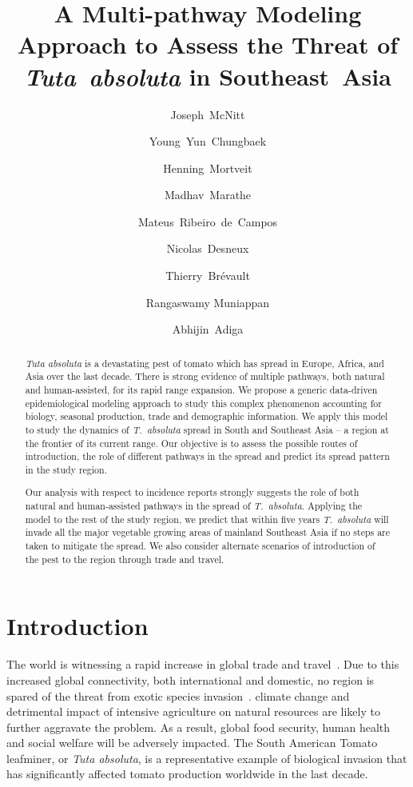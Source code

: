 \documentclass[11pt]{article}
\title{A Multi-pathway Modeling Approach to Assess the Threat of
\emph{Tuta~absoluta} in Southeast~Asia}
\author[1]{Joseph~McNitt}
\author[1]{Young~Yun~Chungbaek}
\author[1]{Henning~Mortveit}
\author[1]{Madhav~Marathe}
\author[2]{Mateus~Ribeiro~de~Campos}
\author[2]{Nicolas~Desneux}
\author[3]{Thierry~Br\'{e}vault}
\author[4]{Rangaswamy Muniappan}
\author[1]{Abhijin~Adiga}
\affil[1]{Biocomplexity Institute of Virginia Tech}
\affil[2]{French National Institute for Agricultural Research}
\affil[3]{CIRAD, BIOPASS}
\affil[4]{Feed the Future Integrated Pest Management Innovation Lab}
\date{}
\newcommand{\tuta}{\emph{T.~absoluta}}
\theoremstyle{definition}
\begin{document}
\maketitle

\begin{abstract}
\emph{Tuta absoluta} is a devastating pest of tomato which has
spread in Europe, Africa, and Asia over the last decade. There is strong
evidence of multiple pathways, both natural and human-assisted, for its
rapid range expansion. We propose a generic data-driven epidemiological
modeling approach to study this complex phenomenon accounting for biology,
seasonal production, trade and demographic information. We apply this model
to study the dynamics of \tuta{} spread in South and Southeast Asia -- a
region at the frontier of its current range. Our objective is to assess the
possible routes of introduction, the role of different pathways in the
spread and predict its spread pattern in the study region.

Our analysis with respect to incidence reports strongly suggests the role
of both natural and human-assisted pathways in the spread of \tuta{}.
Applying the model to the rest of the study region, we predict that within
five years \tuta{} will invade all the major vegetable growing areas of
mainland Southeast Asia if no steps are taken to mitigate the spread. We
also consider alternate scenarios of introduction of the pest to the region
through trade and travel.  
\end{abstract}
\section{Introduction}
The world is witnessing a rapid increase in global trade and
travel~\cite{ercsey2012complexity}. Due to this increased global
connectivity, both international and domestic, no region is spared of the
threat from exotic species invasion~\cite{hulme2009trade}.  
climate change and detrimental impact of intensive agriculture on natural
resources are likely to further aggravate the problem. As a result, global food security,
human health and social welfare will be adversely impacted. The South
American Tomato leafminer, or \emph{Tuta absoluta}, is a representative
example of biological invasion that has significantly affected tomato
production worldwide in the last decade.
\end{document}
